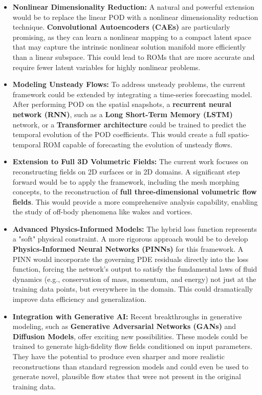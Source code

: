 \documentclass[dscexam, EN]{ufabcFHZh}
\begin{document}
\begin{itemize}
    \item \textbf{Nonlinear Dimensionality Reduction:} A natural and powerful extension would be to replace the linear POD with a nonlinear dimensionality reduction technique. \textbf{Convolutional Autoencoders (CAEs)} are particularly promising, as they can learn a nonlinear mapping to a compact latent space that may capture the intrinsic nonlinear solution manifold more efficiently than a linear subspace. This could lead to ROMs that are more accurate and require fewer latent variables for highly nonlinear problems.

    \item \textbf{Modeling Unsteady Flows:} To address unsteady problems, the current framework could be extended by integrating a time-series forecasting model. After performing POD on the spatial snapshots, a \textbf{recurrent neural network (RNN)}, such as a \textbf{Long Short-Term Memory (LSTM)} network, or a \textbf{Transformer architecture} could be trained to predict the temporal evolution of the POD coefficients. This would create a full spatio-temporal ROM capable of forecasting the evolution of unsteady flows.

    \item \textbf{Extension to Full 3D Volumetric Fields:} The current work focuses on reconstructing fields on 2D surfaces or in 2D domains. A significant step forward would be to apply the framework, including the mesh morphing concepts, to the reconstruction of \textbf{full three-dimensional volumetric flow fields}. This would provide a more comprehensive analysis capability, enabling the study of off-body phenomena like wakes and vortices.

    \item \textbf{Advanced Physics-Informed Models:} The hybrid loss function represents a "soft" physical constraint. A more rigorous approach would be to develop \textbf{Physics-Informed Neural Networks (PINNs)} for this framework. A PINN would incorporate the governing PDE residuals directly into the loss function, forcing the network's output to satisfy the fundamental laws of fluid dynamics (e.g., conservation of mass, momentum, and energy) not just at the training data points, but everywhere in the domain. This could dramatically improve data efficiency and generalization.

    \item \textbf{Integration with Generative AI:} Recent breakthroughs in generative modeling, such as \textbf{Generative Adversarial Networks (GANs)} and \textbf{Diffusion Models}, offer exciting new possibilities. These models could be trained to generate high-fidelity flow fields conditioned on input parameters. They have the potential to produce even sharper and more realistic reconstructions than standard regression models and could even be used to generate novel, plausible flow states that were not present in the original training data.
\end{itemize}
\end{document}
